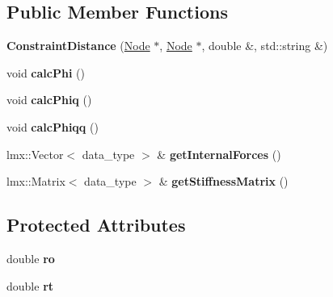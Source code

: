 \subsection*{Public Member Functions}
\begin{CompactItemize}
\item 
\hypertarget{classmknix_1_1ConstraintDistance_dc9113e52374f275b1b79bfdca72b971}{
\textbf{ConstraintDistance} (\hyperlink{classmknix_1_1Node}{Node} $\ast$, \hyperlink{classmknix_1_1Node}{Node} $\ast$, double \&, std::string \&)}
\label{classmknix_1_1ConstraintDistance_dc9113e52374f275b1b79bfdca72b971}

\item 
\hypertarget{classmknix_1_1ConstraintDistance_d838af34d5ada5ba2f4ce559a472e16a}{
void \textbf{calcPhi} ()}
\label{classmknix_1_1ConstraintDistance_d838af34d5ada5ba2f4ce559a472e16a}

\item 
\hypertarget{classmknix_1_1ConstraintDistance_6fa6c37266c01a1e8f577418dd886037}{
void \textbf{calcPhiq} ()}
\label{classmknix_1_1ConstraintDistance_6fa6c37266c01a1e8f577418dd886037}

\item 
\hypertarget{classmknix_1_1ConstraintDistance_d4d1eb206239508f7f2f5b4d26b957eb}{
void \textbf{calcPhiqq} ()}
\label{classmknix_1_1ConstraintDistance_d4d1eb206239508f7f2f5b4d26b957eb}

\item 
\hypertarget{classmknix_1_1ConstraintDistance_ae757ba28e181259a196fbc0a1e8bfaf}{
lmx::Vector$<$ data\_\-type $>$ \& \textbf{getInternalForces} ()}
\label{classmknix_1_1ConstraintDistance_ae757ba28e181259a196fbc0a1e8bfaf}

\item 
\hypertarget{classmknix_1_1ConstraintDistance_2fe47c4ed3d284a39bd3239f8083ae89}{
lmx::Matrix$<$ data\_\-type $>$ \& \textbf{getStiffnessMatrix} ()}
\label{classmknix_1_1ConstraintDistance_2fe47c4ed3d284a39bd3239f8083ae89}

\end{CompactItemize}
\subsection*{Protected Attributes}
\begin{CompactItemize}
\item 
\hypertarget{classmknix_1_1ConstraintDistance_2d4a4e3c3b75b23f63a772b71c4badaa}{
double \textbf{ro}}
\label{classmknix_1_1ConstraintDistance_2d4a4e3c3b75b23f63a772b71c4badaa}

\item 
\hypertarget{classmknix_1_1ConstraintDistance_e4054619a2e3205079c4911ad69db4eb}{
double \textbf{rt}}
\label{classmknix_1_1ConstraintDistance_e4054619a2e3205079c4911ad69db4eb}

\end{CompactItemize}



